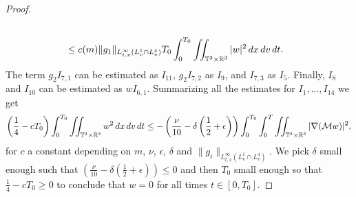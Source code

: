 \documentclass[10pt,a4paper]{amsart}
\newcommand{\CalM}{\mathcal{M}}
\newcommand{\Eps}{\epsilon}
\newcommand{\R}{\mathbb R}
\newcommand{\T}{\mathbb{T}}
\newcommand{\dt}{\, {\rm d} t}
\newcommand{\dv}{\, {\rm d} v}
\newcommand{\dx}{\, {\rm d} x}
\begin{document}
\begin{proof}
\begin{align*}
\\
&\le c(m) \|g_1\|_{L^\infty_{t,x}(L_v^1\cap L_v^4)} T_0 \int_0^{T_0}\iint_{\T^3 \times \R^3}  |w| ^2 \dx\dv\dt. 
\end{align*}
The term $g_2 I_{7,1}$ can be estimated as $I_{11}$, $g_2 I_{7,2}$ as $I_9$, and $I_{7,3}$ as $I_5$.  
Finally, $I_8$ and $I_{10}$ can be estimated as $w I_{6,1}$. Summarizing all the estimates for $I_1,...,I_{14}$ we get 
\begin{align*}
\left(\frac{1}{4}-cT_0\right) \int_0^{T_0} \iint_{\T^3 \times \R^3} w^2 \dx\dv\dt 
\le 
-\left(\frac{\nu}{10}-\delta\left(\frac{1}{2}+\Eps\right)\right) \int_0^{T_0}\int_0^{T} \iint_{\T^3 \times \R^3} |\nabla(\CalM w)|^2, %
\end{align*}
for $c$ a constant depending on $m$, $\nu$, $\Eps$, $\delta$ and $\|g_i\|_{L^\infty_{t,x}(L^1_v\cap L^4_v)}$. We pick $\delta$ small enough such that $\left(\frac{\nu}{10}-\delta\left(\frac{1}{2}+\Eps\right)\right)\le 0$ and then $T_0$ small enough so that $\frac{1}{4}-cT_0\ge 0$ to conclude that $w = 0$ for all times $t\in [0,T_0]$. 
\end{proof}
\end{document}
